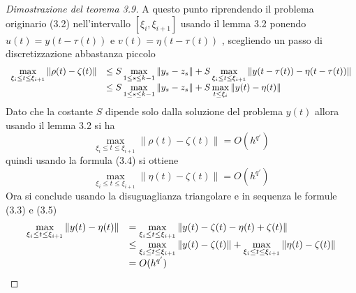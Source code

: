 \begin{proof}[Dimostrazione del teorema 3.9]
A questo punto riprendendo il problema originario (3.2) nell'intervallo $[\xi_i, \xi_{i+1}]$ usando il lemma 3.2 ponendo $u(t)=y(t-\tau(t))$ e 
$v(t)=\eta(t-\tau(t))$ , scegliendo un passo di discretizzazione abbastanza piccolo
\renewcommand\arraystretch{1,5}
$$
\begin{array}{c lc}
\displaystyle
\max_{\xi_i \le t \le \xi_{i+1}} \| \rho(t) - \zeta(t) \|  	& \displaystyle	\le	 S \max_{1 \le s \le k-1} \| y_s - z_s \| 
									+ S \max_{\xi_i \le t \le \xi_{i+1}} \| y(t-\tau(t)) - \eta(t- \tau(t)) \|
\\
								& \displaystyle \le	 S \max_{1 \le s \le k-1} \| y_s - z_s \|
									+ S \max_{t \le \xi_i} \| y(t) - \eta(t) \|
\end{array}
$$
\renewcommand\arraystretch{1}
Dato che la costante $S$ dipende solo dalla soluzione del problema $y(t)$ allora usando il lemma 3.2 si ha
$$
\max_{\xi_i \le t \le \xi_{i+1}} \| \rho(t) - \zeta(t) \| = O(h^{q'})
$$
quindi usando la formula (3.4) si ottiene
\begin{equation}
 \max_{\xi_i \le t \le \xi_{i+1}} \| \eta(t) - \zeta(t)	\| = O(h^{q'})
\end{equation}
Ora si conclude usando la disuguaglianza triangolare e in sequenza le formule (3.3) e (3.5)
\renewcommand\arraystretch{1,5}
$$
\begin{array}{c lc}
\displaystyle
 \max_{\xi_i \le t \le \xi_{i+1}}  \| y(t)- \eta(t) \| 		&	\displaystyle
									=   \max_{\xi_i \le t \le \xi_{i+1}} 	
										  \| y(t) - \zeta(t) -\eta(t) + \zeta(t) \| 			\\
								&	\displaystyle
									\le  \max_{\xi_i \le t \le \xi_{i+1}} 
										  \| y(t) - \zeta(t) \| +  
									      \max_{\xi_i \le t \le \xi_{i+1}}  \| \eta(t) - \zeta(t) \| 	\\
								&	\displaystyle
									= O(h^{q'})
\end{array}
$$
\renewcommand\arraystretch{1}


\end{proof}

